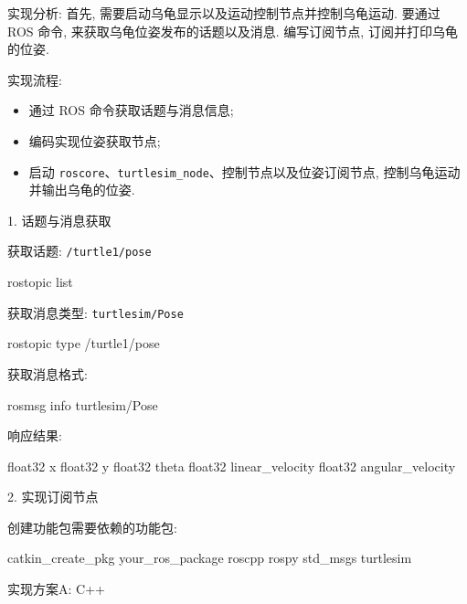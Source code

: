 \documentclass[openany, fontset=windowsold]{ctexbook}
\theoremstyle{kaiti}
\theoremstyle{normal}
\begin{document}
实现分析: 首先, 需要启动乌龟显示以及运动控制节点并控制乌龟运动. 要通过 ROS 命令, 来获取乌龟位姿发布的话题以及消息. 编写订阅节点, 订阅并打印乌龟的位姿.

实现流程:

\begin{itemize}
  \item 通过 ROS 命令获取话题与消息信息;
  \item 编码实现位姿获取节点;
  \item 启动 \verb|roscore|、\verb|turtlesim_node|、控制节点以及位姿订阅节点, 控制乌龟运动并输出乌龟的位姿.
\end{itemize}

1. 话题与消息获取

获取话题: \verb|/turtle1/pose|

\begin{bash}
  rostopic list
\end{bash}

获取消息类型: \verb|turtlesim/Pose|

\begin{bash}
  rostopic type  /turtle1/pose
\end{bash}

获取消息格式:

\begin{bash}
  rosmsg info turtlesim/Pose
\end{bash}

响应结果:

\begin{bash}
  float32 x
  float32 y
  float32 theta
  float32 linear_velocity
  float32 angular_velocity
\end{bash}

2. 实现订阅节点

创建功能包需要依赖的功能包: 

\begin{bash}
  catkin_create_pkg your_ros_package roscpp rospy std_msgs turtlesim
\end{bash}

实现方案A: C++
\end{document}
